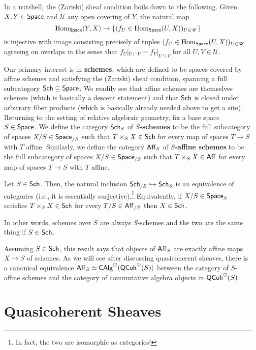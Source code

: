 \documentclass[11pt]{article}
\newcommand{\UU}{\mathscr{U}}
\begin{document}
\begin{remark}
In a nutshell, the (Zariski) sheaf condition boils down to the following. Given $X,Y\in\operatorname{\mathsf{Space}}$ and $\UU$ any open covering of $Y$, the natural map 
$$\Hom_{\Space}(Y,X)\to\{(f_U\in\Hom_{\Space}(U,X))_{U\in\UU}\}$$
is injective with image consisting precisely of tuples $(f_U\in\Hom_{\Space}(U,X))_{U\in\UU}$ agreeing on overlaps in the sense that $f_U|_{U\cap V}=f_V|_{U\cap V}$ for all $U,V\in\UU$.
\end{remark}

Our primary interest is in \textbf{schemes}, which are defined to be spaces covered by affine schemes and satisfying the (Zariski) sheaf condition, spanning a full subcategory $\operatorname{\mathsf{Sch}}\subseteq\operatorname{\mathsf{Space}}$. We readily see that affine schemes are themselves schemes (which is basically a descent statement) and that $\operatorname{\mathsf{Sch}}$ is closed under arbitrary fiber products (which is basically already needed above to get a site). Returning to the setting of relative algebraic geometry, fix a base space $S\in\operatorname{\mathsf{Space}}$. We define the category $\operatorname{\mathsf{Sch}}_S$ of \textbf{$S$-schemes} to be the full subcategory of spaces $X/S\in\operatorname{\mathsf{Space}}_{/S}$ such that $T\times_SX\in\operatorname{\mathsf{Sch}}$ for every map of spaces $T\to S$ with $T$ affine. Similarly, we define the category $\operatorname{\mathsf{Aff}}_S$ of \textbf{$S$-affine schemes} to be the full subcategory of spaces $X/S\in\operatorname{\mathsf{Space}}_{/S}$ such that $T\times_SX\in\operatorname{\mathsf{Aff}}$ for every map of spaces $T\to S$ with $T$ affine.

\begin{theorem}
Let $S\in\operatorname{\mathsf{Sch}}$. Then, the natural inclusion $\operatorname{\mathsf{Sch}}_{/S}\hookrightarrow\operatorname{\mathsf{Sch}}_S$ is an equivalence of categories (i.e., it is essentially surjective).\footnote{In fact, the two are isomorphic as categories!} Equivalently, if $X/S\in\operatorname{\mathsf{Space}}_S$ satisfies $T\times_SX\in\operatorname{\mathsf{Sch}}$ for every $T/S\in\operatorname{\mathsf{Aff}}_{/S}$ then $X\in\operatorname{\mathsf{Sch}}$.
\end{theorem}

In other words, schemes over $S$ are always $S$-schemes and the two are the same thing if $S\in\operatorname{\mathsf{Sch}}$.

\begin{remark}
Assuming $S\in\operatorname{\mathsf{Sch}}$, this result says that objects of $\operatorname{\mathsf{Aff}}_S$ are exactly affine maps $X\to S$ of schemes. As we will see after discussing quasicoherent sheaves, there is a canonical equivalence $\operatorname{\mathsf{Aff}}_S\simeq\operatorname{\mathsf{CAlg}}^{\heartsuit}(\operatorname{\mathsf{QCoh}}^{\heartsuit}(S))$ between the category of $S$-affine schemes and the category of commutative algebra objects in $\operatorname{\mathsf{QCoh}}^{\heartsuit}(S)$.
\end{remark}

\section{Quasicoherent Sheaves}
\end{document}
